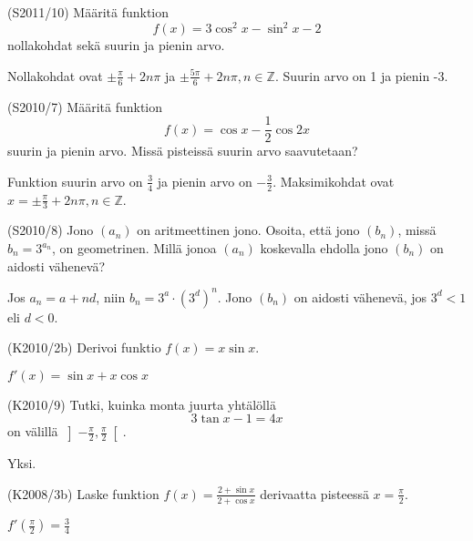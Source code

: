 \begin{tehtava} (S2011/10)
	Määritä funktion \[f(x)=3\cos^2x-\sin^2x-2\] nollakohdat sekä suurin ja pienin arvo.
		\begin{vastaus}
			Nollakohdat ovat $\pm\frac{\pi}{6}+2n\pi$ ja $\pm\frac{5\pi}{6}+2n\pi, 
			n\in\mathbb{Z}$. Suurin arvo on 1 ja pienin -3.
		\end{vastaus}
\end{tehtava}

\begin{tehtava} (S2010/7)
	Määritä funktion \[f(x)=\cos x-\frac{1}{2}\cos 2x\] suurin ja pienin arvo. Missä pisteissä suurin 
	arvo saavutetaan?
		\begin{vastaus}
			Funktion suurin arvo on $\frac{3}{4}$ ja pienin arvo on $-\frac{3}{2}$.
			Maksimikohdat ovat $x=\pm\frac{\pi}{3}+2n\pi, n\in\mathbb{Z}$. 
		\end{vastaus}
\end{tehtava}

\begin{tehtava} (S2010/8)
	Jono $(a_n)$ on aritmeettinen jono. Osoita, että jono $(b_n)$, missä $b_n=3^{a_n}$, on geometrinen. 
	Millä jonoa $(a_n)$ koskevalla ehdolla jono $(b_n)$ on aidosti vähenevä?
		\begin{vastaus}
			Jos $a_n=a+nd$, niin $b_n=3^a\cdot(3^d)^n$. Jono $(b_n)$ on aidosti vähenevä, jos 
			$3^d<1$ eli $d<0$.
		\end{vastaus}
\end{tehtava}

\begin{tehtava} (K2010/2b)
	Derivoi funktio $f(x)=x\sin x$.
		\begin{vastaus}
			$f'(x)=\sin x+x\cos x$
		\end{vastaus}
\end{tehtava}

\begin{tehtava} (K2010/9)
	Tutki, kuinka monta juurta yhtälöllä \[3\tan x-1=4x\] on välillä 
	$\left]-\frac{\pi}{2},\frac{\pi}{2}\right[$.
		\begin{vastaus}
			Yksi.
		\end{vastaus}
\end{tehtava}

\begin{tehtava} (K2008/3b)
	Laske funktion $f(x)=\frac{2+\sin x}{2+\cos x}$ derivaatta pisteessä $x=\frac{\pi}{2}$.
		\begin{vastaus}
			$f'(\frac{\pi}{2})=\frac{3}{4}$
		\end{vastaus}
\end{tehtava}

